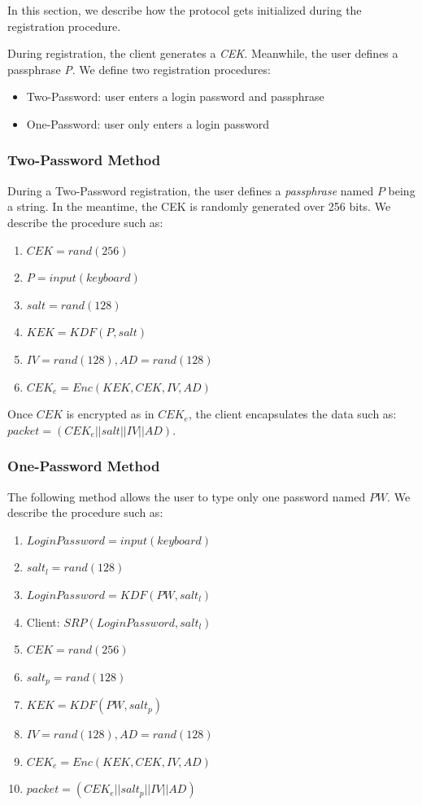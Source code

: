 \documentclass[a4paper,9pt,twoside]{article}
\begin{document}
    In this section, we describe how the protocol gets initialized during the 
registration procedure.

    During registration, the client generates a \emph{CEK}. Meanwhile, 
the user defines a passphrase \emph{P}. We define two registration procedures:

\begin{itemize}
\itemsep0em
\item Two-Password: user enters a login password and passphrase
\item One-Password: user only enters a login password
\end{itemize}

\subsubsection{Two-Password Method}

During a Two-Password registration, the user defines a \emph{passphrase} named $P$ being a string. In the meantime, the CEK 
is randomly generated over 256 bits. We describe the procedure such as:

\begin{enumerate}
\itemsep0em
\item $CEK=rand(256)$
\item $P=input(keyboard)$
\item $salt=rand(128)$
\item $KEK=KDF(P, salt)$
\item $IV=rand(128), AD=rand(128)$
\item $CEK_e=Enc(KEK, CEK, IV, AD)$
\end{enumerate}

Once $CEK$ is encrypted as in $CEK_e$, the client encapsulates the data such as: 
$packet=(CEK_e||salt||IV||AD)$.

\subsubsection{One-Password Method}

The following method allows the user to type only one password named $PW$. We describe the 
procedure such as:

\begin{enumerate}
\itemsep0em
\item $LoginPassword=input(keyboard)$
\item $salt_l=rand(128)$
\item $LoginPassword=KDF(PW, salt_l)$
\item Client: $SRP(LoginPassword, salt_l)$
\item $CEK=rand(256)$
\item $salt_p=rand(128)$
\item $KEK=KDF(PW, salt_p)$
\item $IV=rand(128), AD=rand(128)$
\item $CEK_e=Enc(KEK, CEK, IV, AD)$
\item $packet=(CEK_e||salt_p||IV||AD)$
\end{enumerate}
\end{document}
